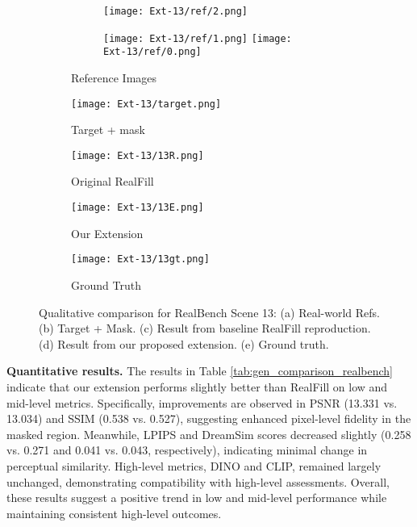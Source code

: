 \documentclass{article}
\begin{document}
\begin{figure}[H]
    \begin{subfigure}[b]{0.19\linewidth}
        \begin{subfigure}[b]{0.65\linewidth}
            \texttt{[image: Ext-13/ref/2.png]}
        \end{subfigure}
        \begin{subfigure}[b]{0.32\linewidth}
            \texttt{[image: Ext-13/ref/1.png]}
            \texttt{[image: Ext-13/ref/0.png]}
        \end{subfigure}
        \caption{Reference Images}
    \end{subfigure}
    \hfill
    \begin{subfigure}[b]{0.19\textwidth}
        \centering
        \texttt{[image: Ext-13/target.png]}
        \caption{Target + mask}
    \end{subfigure}
    \hfill
    \begin{subfigure}[b]{0.19\textwidth}
        \centering
        \texttt{[image: Ext-13/13R.png]}
        \caption{Original RealFill}
    \end{subfigure}
    \hfill
    \begin{subfigure}[b]{0.19\textwidth}
        \centering
        \texttt{[image: Ext-13/13E.png]}
        \caption{Our Extension}
    \end{subfigure}
    \hfill
    \begin{subfigure}[b]{0.19\textwidth}
        \centering
        \texttt{[image: Ext-13/13gt.png]}
        \caption{Ground Truth}
    \end{subfigure}
    \caption{Qualitative comparison for RealBench Scene 13: (a) Real-world Refs. (b) Target + Mask. (c) Result from baseline RealFill reproduction. (d) Result from our proposed extension. (e) Ground truth.}
    \label{fig:extension_qualitative}
\end{figure}

\textbf{Quantitative results.} The results in Table \ref{tab:gen_comparison_realbench} indicate that our extension performs slightly better than RealFill on low and mid-level metrics. Specifically, improvements are observed in PSNR (13.331 vs. 13.034) and SSIM (0.538 vs. 0.527), suggesting enhanced pixel-level fidelity in the masked region. Meanwhile, LPIPS and DreamSim scores decreased slightly (0.258 vs. 0.271 and 0.041 vs. 0.043, respectively), indicating minimal change in perceptual similarity. High-level metrics, DINO and CLIP, remained largely unchanged, demonstrating compatibility with high-level assessments. Overall, these results suggest a positive trend in low and mid-level performance while maintaining consistent high-level outcomes.
\end{document}

